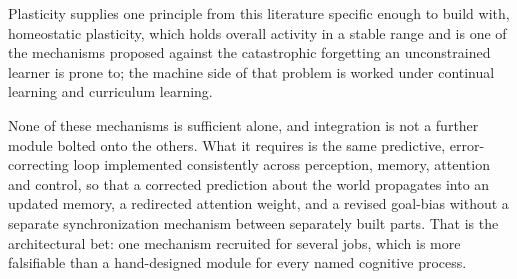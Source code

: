 Plasticity supplies one principle from this literature specific enough to build with, homeostatic plasticity, which holds overall activity in a stable range and is one of the mechanisms proposed against the catastrophic forgetting an unconstrained learner is prone to; the machine side of that problem is worked under continual learning and curriculum learning.

None of these mechanisms is sufficient alone, and integration is not a further module bolted onto the others. What it requires is the same predictive, error-correcting loop implemented consistently across perception, memory, attention and control, so that a corrected prediction about the world propagates into an updated memory, a redirected attention weight, and a revised goal-bias without a separate synchronization mechanism between separately built parts. That is the architectural bet: one mechanism recruited for several jobs, which is more falsifiable than a hand-designed module for every named cognitive process.

